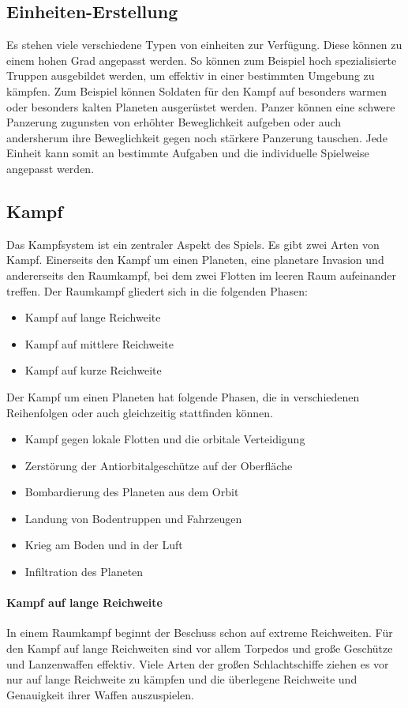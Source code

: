 \documentclass[11pt, a4paper]{article}
\begin{document}
\subsection{Einheiten-Erstellung}
Es stehen viele verschiedene Typen von einheiten zur Verfügung. Diese können zu einem hohen Grad angepasst
werden. So können zum Beispiel hoch spezialisierte Truppen ausgebildet werden, um effektiv in einer bestimmten
Umgebung zu kämpfen. Zum Beispiel können Soldaten für den Kampf auf besonders warmen oder besonders kalten 
Planeten ausgerüstet werden. Panzer können eine schwere Panzerung zugunsten von erhöhter Beweglichkeit 
aufgeben oder auch andersherum ihre Beweglichkeit gegen noch stärkere Panzerung tauschen. Jede Einheit kann
somit an bestimmte Aufgaben und die individuelle Spielweise angepasst werden.
%
\subsection{Kampf}
Das Kampfsystem ist ein zentraler Aspekt des Spiels. Es gibt zwei Arten von Kampf. Einerseits den Kampf um 
einen Planeten, eine planetare Invasion und andererseits den Raumkampf, bei dem zwei Flotten im leeren Raum
aufeinander treffen. Der Raumkampf gliedert sich in die folgenden Phasen:
\begin{itemize}
    \item Kampf auf lange Reichweite
    \item Kampf auf mittlere Reichweite
    \item Kampf auf kurze Reichweite
\end{itemize}
%
Der Kampf um einen Planeten hat folgende Phasen, die in verschiedenen Reihenfolgen oder auch gleichzeitig
stattfinden können.
\begin{itemize}
    \item Kampf gegen lokale Flotten und die orbitale Verteidigung
    \item Zerstörung der Antiorbitalgeschütze auf der Oberfläche
    \item Bombardierung des Planeten aus dem Orbit
    \item Landung von Bodentruppen und Fahrzeugen
    \item Krieg am Boden und in der Luft
    \item Infiltration des Planeten
\end{itemize}
%
\paragraph{Kampf auf lange Reichweite}
In einem Raumkampf beginnt der Beschuss schon auf extreme Reichweiten. Für den Kampf auf lange Reichweiten
sind vor allem Torpedos und große Geschütze und Lanzenwaffen effektiv. Viele Arten der großen Schlachtschiffe
ziehen es vor nur auf lange Reichweite zu kämpfen und die überlegene Reichweite und Genauigkeit ihrer Waffen
auszuspielen. 
%
\end{document}
